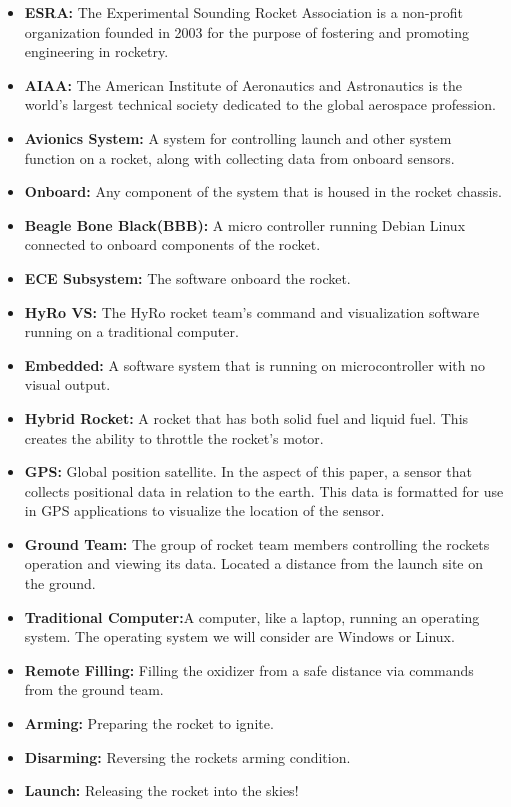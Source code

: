 \documentclass[10pt,draftclsnofoot,onecolumn,compsoc]{IEEEtran}
\begin{document}
\begin{itemize}
\item{\bf ESRA:}  The Experimental Sounding Rocket Association is a non-profit organization founded in 2003 for the purpose of fostering and promoting engineering in rocketry.
\item{\bf AIAA:} The American Institute of Aeronautics and Astronautics is the world's largest technical society dedicated to the global aerospace profession.
\item{\bf Avionics System:}  A system for controlling launch and other system function on a rocket, along with collecting data from onboard sensors.
\item{\bf Onboard:} Any component of the system that is housed in the rocket chassis.
\item{\bf Beagle Bone Black(BBB):}   A micro controller running Debian Linux connected to onboard components of the rocket.
\item{\bf ECE Subsystem:}  The software onboard the rocket.
\item{\bf HyRo VS:} The HyRo rocket team's command and visualization software running on a traditional computer.
\item{\bf Embedded:} A software system that is running on microcontroller with no visual output.
\item{\bf Hybrid Rocket:} A rocket that has both solid fuel and liquid fuel. This creates the ability to throttle the rocket's motor.
\item{\bf GPS:} Global position satellite. In the aspect of this paper, a sensor that collects positional data in relation to the earth. This data is formatted for use in GPS applications to visualize the location of the sensor.
\item{\bf Ground Team:} The group of rocket team members controlling the rockets operation and viewing its data. Located a distance from the launch site on the ground.
\item{\bf Traditional Computer:}A computer, like a laptop, running an operating system. The operating system we will consider are Windows or Linux.
\item{\bf Remote Filling:} Filling the oxidizer from a safe distance via commands from the ground team.
\item{\bf Arming:} Preparing the rocket to ignite.
\item{\bf Disarming:} Reversing the rockets arming condition. 
\item{\bf Launch:} Releasing the rocket into the skies! 

\end{itemize}
\end{document}
